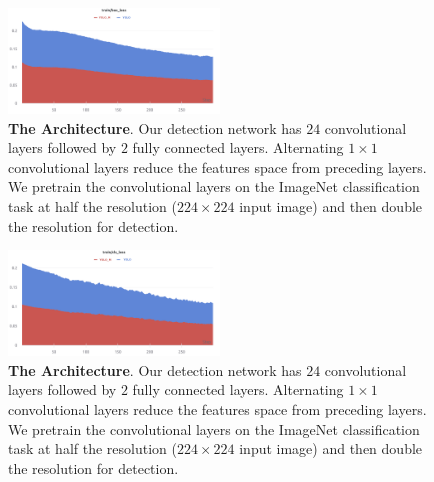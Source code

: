 \begin{figure}[H] %
  \centering
  \includegraphics[width=0.5\textwidth]{figures/paper/box-loss.png}
  \caption[The Architecture]{\textbf{The Architecture}. Our detection network has $24$ convolutional layers followed by $2$ fully connected layers. Alternating $1 \times 1$ convolutional layers reduce the features space from preceding layers. We pretrain the convolutional layers on the ImageNet classification task at half the resolution ($224 \times 224$ input image) and then double the resolution for detection.}
  \label{fig:figures/paper/box-loss}
\end{figure}


\begin{figure}[H] %
  \centering
  \includegraphics[width=0.5\textwidth]{figures/paper/cls-loss.png}
  \caption[The Architecture]{\textbf{The Architecture}. Our detection network has $24$ convolutional layers followed by $2$ fully connected layers. Alternating $1 \times 1$ convolutional layers reduce the features space from preceding layers. We pretrain the convolutional layers on the ImageNet classification task at half the resolution ($224 \times 224$ input image) and then double the resolution for detection.}
  \label{fig:figures/paper/cls-loss}
\end{figure}

